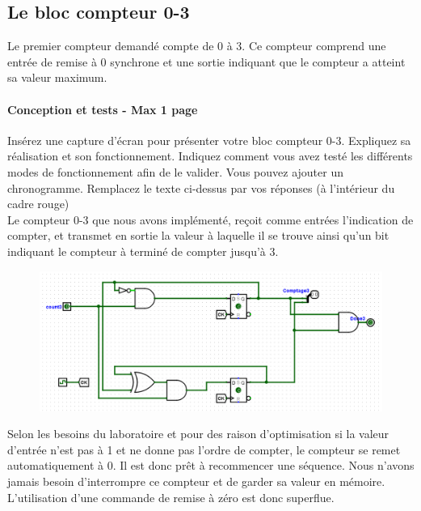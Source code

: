 \documentclass[a4paper]{article} %
\begin{document}
\subsection{Le bloc compteur 0-3}
Le premier compteur demandé compte de 0 à 3. Ce compteur comprend une entrée de remise à 0 synchrone et une sortie indiquant que le compteur a atteint sa valeur maximum.
	
\begin{tcolorbox}[colframe=Monokaimagenta,colback=white, breakable, enhanced]
\paragraph{Conception et tests - Max 1 page }
Insérez une capture d’écran pour présenter votre bloc compteur 0-3. Expliquez sa réalisation et son fonctionnement.
Indiquez comment vous avez testé les différents modes de fonctionnement afin de le valider. Vous pouvez ajouter un chronogramme.
Remplacez le texte ci-dessus par vos réponses (à l’intérieur du cadre rouge)\\



Le compteur 0-3 que nous avons implémenté, reçoit comme entrées l'indication de compter, et transmet en sortie la valeur à laquelle il se trouve ainsi qu'un bit indiquant le compteur à terminé de compter jusqu'à 3.\\	
\begin{figure}[H]
	\centering
	\includegraphics[width=\textwidth]{src/CPT_03_1}
	\label{fig:CPT_03_1}
\end{figure}
Selon les besoins du laboratoire et pour des raison d'optimisation si la valeur d'entrée n'est pas à 1 et ne donne pas l'ordre de compter, le compteur se remet automatiquement à 0. Il est donc prêt à recommencer une séquence. Nous n'avons jamais besoin d'interrompre ce compteur et de garder sa valeur en mémoire. L'utilisation d'une commande de remise à zéro est donc superflue.\\


\end{tcolorbox}
\end{document}
